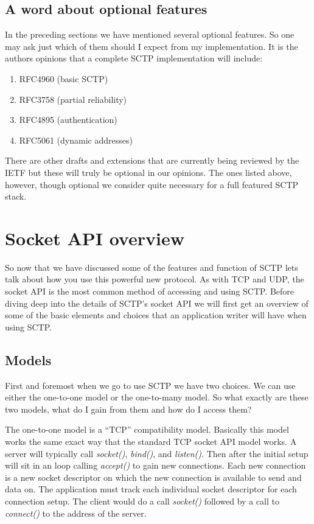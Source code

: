 \documentclass[conference]{IEEEtran}
\begin{document}
\subsection{A word about optional features}
\label{options}
In the preceding sections we have mentioned several optional
features. So one may ask just which of them should I expect from
my implementation. It is the authors opinions that a complete 
SCTP implementation will include:
\begin{enumerate}
 \item  RFC4960 (basic SCTP)
 \item  RFC3758 (partial reliability)
 \item  RFC4895 (authentication)
 \item  RFC5061 (dynamic addresses)
\end{enumerate}

There are other drafts and extensions that are currently being
reviewed by the IETF but these will truly be optional in our
opinions. The ones listed above, however, though optional we
consider quite necessary for a full featured SCTP stack.

\section{Socket API overview}
So now that we have discussed some of the features and function of SCTP lets
talk about how you use this powerful new protocol. As with TCP and UDP, the socket
API is the most common method of accessing and using SCTP. Before diving deep into
the details of SCTP's socket API we will first get an overview of some of the
basic elements and choices that an application writer will have when using
SCTP.

\subsection{Models}
First and foremost when we go to use SCTP we have two choices. We can
use either the one-to-one model or the one-to-many model. So what exactly
are these two models, what do I gain from them and how do I access them?

The one-to-one model is a ``TCP'' compatibility model. Basically this model
works the same exact way that the standard TCP socket API model works.
A server will typically call \emph{socket()}, \emph{bind()}, and \emph{listen()}. Then after
the initial setup will sit in an loop calling \emph{accept()} to gain new connections.
Each new connection is a new socket descriptor on which the new
connection is available to send and data on. The application must track each individual socket
descriptor for each connection setup.  The client would do a call \emph{socket()}  followed by a call to \emph{connect()} to the
address of the server. 
\end{document}
